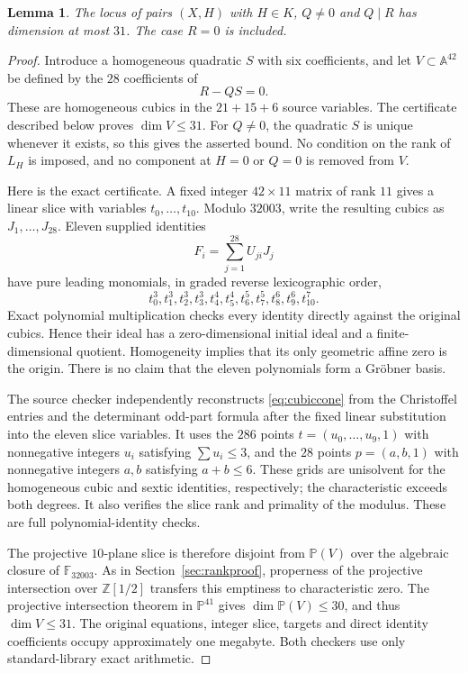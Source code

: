 \documentclass[11pt]{amsart}
\newtheorem{lemma}[theorem]{Lemma}
\theoremstyle{remark}
\newcommand{\PP}{\mathbb P}
\begin{document}
\begin{lemma}\label{lem:quarticdivisibility}
The locus of pairs $(X,H)$ with $H\in K$, $Q\ne0$ and $Q\mid R$ has dimension at most $31$. The case $R=0$ is included.
\end{lemma}

\begin{proof}
Introduce a homogeneous quadratic $S$ with six coefficients, and let $V\subset\mathbb A^{42}$ be defined by the $28$ coefficients of
\begin{equation}\label{eq:cubiccone}
 R-QS=0.
\end{equation}
These are homogeneous cubics in the $21+15+6$ source variables. The certificate described below proves $\dim V\leq31$. For $Q\ne0$, the quadratic $S$ is unique whenever it exists, so this gives the asserted bound. No condition on the rank of $L_H$ is imposed, and no component at $H=0$ or $Q=0$ is removed from $V$.

Here is the exact certificate. A fixed integer $42\times11$ matrix of rank $11$ gives a linear slice with variables $t_0,\ldots,t_{10}$. Modulo $32003$, write the resulting cubics as $J_1,\ldots,J_{28}$. Eleven supplied identities
\[
 F_i=\sum_{j=1}^{28}U_{ji}J_j
\]
have pure leading monomials, in graded reverse lexicographic order,
\begin{equation}\label{eq:finitepowers}
 t_0^3,t_1^3,t_2^3,t_3^3,t_4^4,t_5^4,
 t_6^5,t_7^5,t_8^6,t_9^6,t_{10}^7.
\end{equation}
Exact polynomial multiplication checks every identity directly against the original cubics. Hence their ideal has a zero-dimensional initial ideal and a finite-dimensional quotient. Homogeneity implies that its only geometric affine zero is the origin. There is no claim that the eleven polynomials form a Gr\"obner basis.

The source checker independently reconstructs \eqref{eq:cubiccone} from the Christoffel entries and the determinant odd-part formula after the fixed linear substitution into the eleven slice variables. It uses the $286$ points $t=(u_0,\ldots,u_9,1)$ with nonnegative integers $u_i$ satisfying $\sum u_i\leq3$, and the $28$ points $p=(a,b,1)$ with nonnegative integers $a,b$ satisfying $a+b\leq6$. These grids are unisolvent for the homogeneous cubic and sextic identities, respectively; the characteristic exceeds both degrees. It also verifies the slice rank and primality of the modulus. These are full polynomial-identity checks.

The projective $10$-plane slice is therefore disjoint from $\PP(V)$ over the algebraic closure of $\mathbb F_{32003}$. As in Section~\ref{sec:rankproof}, properness of the projective intersection over $\mathbb Z[1/2]$ transfers this emptiness to characteristic zero. The projective intersection theorem in $\PP^{41}$ gives $\dim\PP(V)\leq30$, and thus $\dim V\leq31$. The original equations, integer slice, targets and direct identity coefficients occupy approximately one megabyte. Both checkers use only standard-library exact arithmetic.
\end{proof}
\end{document}

